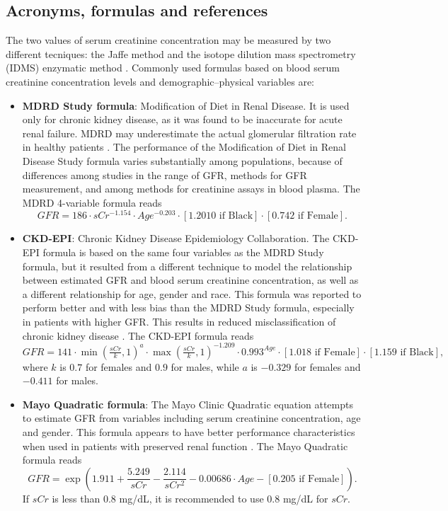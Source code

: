 \documentclass[10pt,final]{siamltex}
\begin{document}
\subsection{Acronyms, formulas and references}
%
The two values of serum creatinine concentration may be measured by two different tecniques: the Jaffe  method \cite{jaffe} and the isotope dilution mass spectrometry (IDMS) enzymatic method \cite{idms}. Commonly used formulas based on blood serum creatinine concentration levels and demographic--physical variables are:
%
\begin{itemize}
  \item \textbf{MDRD Study formula}: Modification of Diet in Renal Disease. It is used only for chronic kidney disease, as it was found to be inaccurate for acute renal failure. MDRD may underestimate the actual glomerular filtration rate in healthy patients \cite{MDRD,mayo}. The performance of the Modification of Diet in Renal Disease Study formula varies substantially among populations, because of differences among studies in the range of GFR, methods for GFR measurement, and among methods for creatinine assays in blood plasma. The MDRD 4-variable formula reads
  \begin{equation}
    \mathit{GFR} = 186 \cdot sCr^{-1.154}\cdot Age^{-0.203} \cdot [1.2010 \text{ if Black}] \cdot [0.742 \text{ if Female}].
  \end{equation}

  \item \textbf{CKD-EPI}: Chronic Kidney Disease Epidemiology Collaboration. The CKD-EPI formula is based on the same four variables as the MDRD Study formula, but it resulted from a different technique to model the relationship between estimated GFR and blood serum creatinine concentration, as well as a different relationship for age, gender and race. This formula was reported to perform better and with less bias than the MDRD Study formula, especially in patients with higher GFR. This results in reduced misclassification of chronic kidney disease \cite{ckdepi}. The CKD-EPI formula reads
  \begin{equation}
    \mathit{GFR} =141 \cdot \min\left(\tfrac{sCr}{k},1\right)^a\cdot \max\left(\tfrac{sCr}{k},1\right)^{-1.209}\cdot0.993^{Age}\cdot [1.018 \text{ if Female}] \cdot [1.159 \text{ if Black}],
  \end{equation}
  where $k$ is $0.7$ for females and $0.9$ for males, while $a$ is $−0.329$ for females and $−0.411$ for males.

  \item \textbf{Mayo Quadratic formula}: The Mayo Clinic Quadratic equation attempts to estimate GFR from variables including serum creatinine concentration, age and gender. This formula appears to have better performance characteristics when used in patients with preserved renal function \cite{rigalleau,mayo}. The Mayo Quadratic formula reads
  \begin{equation}
    \textit{GFR} = \exp\left(1.911+\frac{5.249}{sCr}-\frac{2.114}{sCr^2}-0.00686\cdot Age - [0.205 \text{ if Female}]\right).
  \end{equation}
  If $sCr$ is less than $0.8$ mg/dL, it is recommended to use $0.8$ mg/dL for $sCr$.


\end{itemize}
\end{document}
